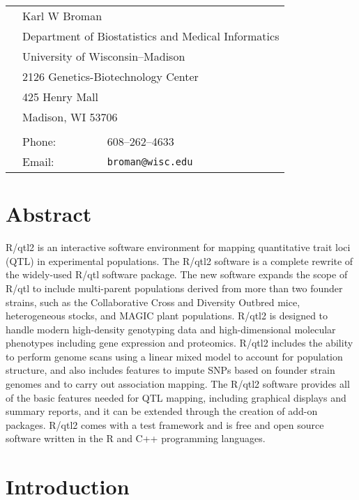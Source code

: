 \documentclass[12pt,letterpaper]{article}
\begin{document}
\begin{tabular}{lll}
 \\
 \hspace{1cm} & \multicolumn{2}{l}{Karl W Broman} \\
 & \multicolumn{2}{l}{Department of Biostatistics and Medical Informatics} \\
 & \multicolumn{2}{l}{University of Wisconsin--Madison} \\
 & \multicolumn{2}{l}{2126 Genetics-Biotechnology Center} \\
 & \multicolumn{2}{l}{425 Henry Mall} \\
 & \multicolumn{2}{l}{Madison, WI 53706} \\
 \\
 & Phone: & 608--262--4633 \\
 & Email: & \verb|broman@wisc.edu|
\end{tabular}


\newpage

\section*{Abstract}

R/qtl2 is an interactive software environment for mapping quantitative trait loci (QTL)
in experimental populations.
The R/qtl2 software is a complete rewrite of the widely-used R/qtl software package.
The new software expands the scope of R/qtl to include
multi-parent populations derived from more than two founder strains, such as the
Collaborative Cross and Diversity Outbred mice, heterogeneous stocks, and
MAGIC plant populations. R/qtl2 is designed to handle modern high-density genotyping data
and high-dimensional molecular phenotypes including gene expression and proteomics.
R/qtl2 includes the ability to perform genome scans using a linear mixed model
to account for population structure, and also includes features to impute SNPs
based on founder strain genomes and to carry out association mapping.
The R/qtl2 software provides all of the basic features needed for QTL mapping,
including graphical displays and summary reports, and it can be extended
through the creation of add-on packages.
R/qtl2 comes with a test
framework and is free and open source software written in the R and
C++ programming languages.

\newpage

\section*{Introduction}
\end{document}
